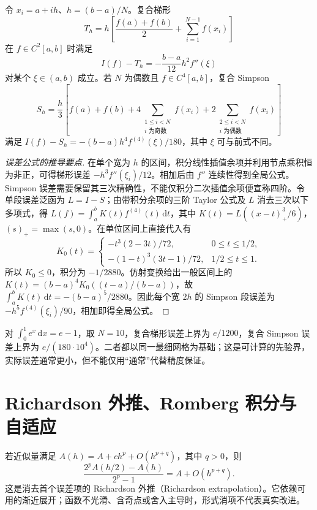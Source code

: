 \begin{theorem}
\label{thm:na-composite-quadrature}
令 $x_i=a+ih$、$h=(b-a)/N$。复合梯形
\[
 T_h=h\left[\frac{f(a)+f(b)}2+\sum_{i=1}^{N-1}f(x_i)\right]
\]
在 $f\in C^2[a,b]$ 时满足
\[
 I(f)-T_h=-\frac{b-a}{12}h^2f''(\xi)
\]
对某个 $\xi\in(a,b)$ 成立。若 $N$ 为偶数且 $f\in C^4[a,b]$，复合 Simpson
\[
 S_h=\frac h3\left[f(a)+f(b)+4\sum_{\substack{1\le i<N\\i\text{ 为奇数}}}f(x_i)
 +2\sum_{\substack{2\le i<N\\i\text{ 为偶数}}}f(x_i)\right]
\]
满足 $I(f)-S_h=-(b-a)h^4f^{(4)}(\xi)/180$，其中 $\xi$ 可与前式不同。
\end{theorem}
\begin{proof}[误差公式的推导要点]
在单个宽为 $h$ 的区间，积分线性插值余项并利用节点乘积恒为非正，可得梯形误差 $-h^3f''(\xi_i)/12$。相加后由 $f''$ 连续性得到全局公式。Simpson 误差需要保留其三次精确性，不能仅积分二次插值余项便宣称四阶。令单段误差泛函为 $L=I-S$；由带积分余项的三阶 Taylor 公式及 $L$ 消去三次以下多项式，得 $L(f)=\int_a^b K(t)f^{(4)}(t)\,\mathrm dt$，其中 $K(t)=L((x-t)_+^3/6)$，$(s)_+=\max(s,0)$。在单位区间上直接代入有
\[
 K_0(t)=\begin{cases}
 -t^3(2-3t)/72,&0\le t\le1/2,\\
 -(1-t)^3(3t-1)/72,&1/2\le t\le1.
 \end{cases}
\]
所以 $K_0\le0$，积分为 $-1/2880$。仿射变换给出一般区间上的 $K(t)=(b-a)^4K_0((t-a)/(b-a))$，故 $\int_a^bK(t)\,\mathrm dt=-(b-a)^5/2880$。因此每个宽 $2h$ 的 Simpson 段误差为 $-h^5f^{(4)}(\xi_i)/90$，相加即得全局公式。
\end{proof}

\begin{example}[带确定误差界的积分]
对 $\int_0^1e^x\,\mathrm dx=e-1$，取 $N=10$，复合梯形误差上界为 $e/1200$，复合 Simpson 误差上界为 $e/(180\cdot10^4)$。二者都以同一最细网格为基础；这是可计算的先验界，实际误差通常更小，但不能仅用“通常”代替精度保证。
\end{example}

\section{Richardson 外推、Romberg 积分与自适应}
\label{sec:na-richardson}
若近似量满足 $A(h)=A+ch^p+O(h^{p+q})$，其中 $q>0$，则
\begin{equation}
 \frac{2^pA(h/2)-A(h)}{2^p-1}=A+O(h^{p+q}).
 \label{eq:na-richardson}
\end{equation}
这是消去首个误差项的 Richardson 外推（Richardson extrapolation）。它依赖可用的渐近展开；函数不光滑、含奇点或舍入主导时，形式消项不代表真实改进。

